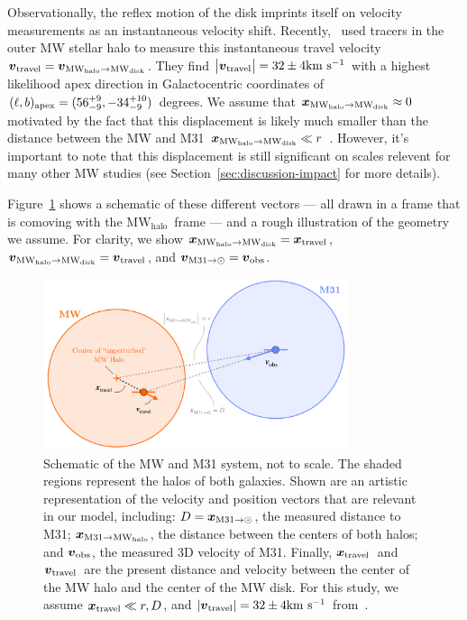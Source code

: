\documentclass[twocolumn]{aastex631}
\newcommand{\bov}{\ensuremath{\boldsymbol{v}}}
\newcommand{\boldx}{\ensuremath{\boldsymbol{x}}}
\newcommand{\vtrav}{\ensuremath{\bov_{\rm travel}}}
\newcommand{\xtrav}{\ensuremath{\boldx_{\rm travel}}}
\newcommand{\pos}[2]{\ensuremath{\boldx_{\rm #1 \to #2}}}
\newcommand{\vel}[2]{\ensuremath{\bov_{\rm #1 \to #2}}}
\newcommand{\mwouter}{\ensuremath{\textrm{MW}_\textrm{halo}}}
\newcommand{\mwdisk}{\ensuremath{\textrm{MW}_\textrm{disk}}}
\begin{document}
Observationally, the reflex motion of the disk imprints itself on velocity
measurements as an instantaneous velocity shift.
Recently,~\cite{Petersen2021} used tracers in the outer MW stellar halo to
measure this instantaneous travel velocity
$\vtrav=\vel{\mwouter}{\mwdisk}$.
They find $\big|\vtrav\big|=32\pm4\kms$ with a highest likelihood apex
direction in Galactocentric coordinates of
$(\ell, b)_{\rm apex} = (56^{+9}_{-9},-34^{+10}_{-9})$ degrees.
We assume that $\pos{\mwouter}{\mwdisk} \approx 0$ motivated by the fact
that this displacement is likely much smaller than the distance between the MW
and M31 $\pos{\mwouter}{\mwdisk} \ll r$ \citep[as expected from simulations,
e.g.,][]{Garavito-Camargo2021b}.
However, it's important to note that this displacement is still significant on
scales relevent for many other MW studies
(see Section~\ref{sec:discussion-impact} for more details).

Figure~\ref{fig:schematic} shows a schematic of these different vectors --- all
drawn in a frame that is comoving with the \mwouter\ frame --- and a rough
illustration of the geometry we assume. For clarity, we show
$\pos{\mwouter}{\mwdisk}= \xtrav$, $\vel{\mwouter}{\mwdisk}=\vtrav$, and
$\vel{M31}{\odot}=\bov_{\rm obs}$.

\begin{figure}[htb]
  \centering
  \includegraphics[width=0.8\textwidth]{schematic.pdf}
  \caption{
    Schematic of the MW and M31 system, not to scale. The shaded regions
    represent the halos of both galaxies. Shown are an artistic representation
    of the velocity and position vectors that are relevant in our model,
    including:
    $D=\pos{M31}{\odot}$, the measured distance to M31;
    $\pos{M31}{\mwouter}$, the distance between the centers of both halos;
    and $\boldsymbol{v}_{\rm obs}$, the measured 3D velocity of M31.
    Finally, \xtrav\ and \vtrav\ are the present distance and velocity
    between the center of the MW halo and the center of the MW disk.
    For this study, we assume $\xtrav\ll r,D$, and $|\vtrav| = 32\pm4 \kms$
    from~\cite{Petersen2021}.
    }
  \label{fig:schematic}
\end{figure}
\end{document}
